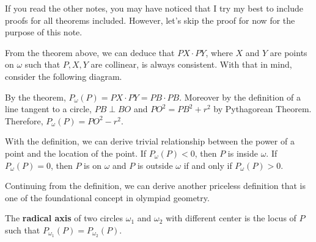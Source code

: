 \documentclass[../../../main.tex]{subfiles}
\begin{document}
If you read the other notes, you may have noticed that I try my
best to include proofs for all theorems included. However, let's
skip the proof for now for the purpose of this note.

From the theorem above, we can deduce that $PX \cdot PY$, where
$X$ and $Y$ are points on $\omega$ such that $P, X, Y$ are collinear,
is always consistent. With that in mind, consider the following
diagram.

\begin{figure}[H]
\centering
{}
\end{figure}

By the theorem, $P_\omega(P) = PX \cdot PY = PB \cdot PB$. Moreover
by the definition of a line tangent to a circle, $PB \perp BO$ and
$PO^2 = PB^2 + r^2$ by Pythagorean Theorem. Therefore, $P_\omega(P)
= PO^2 - r^2$.

\begin{important}
With the definition, we can derive trivial relationship between
the power of a point and the location of the point.
If $P_\omega(P) < 0$, then $P$ is inside $\omega$.
If $P_\omega(P) = 0$, then $P$ is on $\omega$ and $P$ is outside
$\omega$ if and only if $P_\omega(P) > 0$.
\end{important}

Continuing from the definition, we can derive another priceless
definition that is one of the foundational concept in olympiad
geometry.

\begin{definition}{}{}
The \textbf{radical axis} of two circles $\omega_1$ and $\omega_2$
with different center is the locus of $P$ such that $P_{\omega_1}(P)
= P_{\omega_2}(P)$.
\end{definition}
\end{document}
